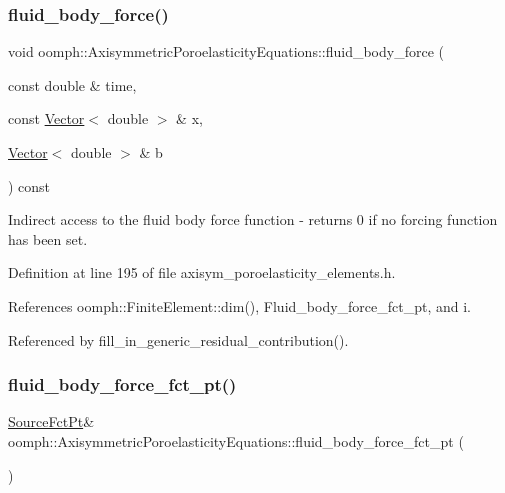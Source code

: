 \subsubsection{\texorpdfstring{fluid\+\_\+body\+\_\+force()}{fluid\_body\_force()}}
{\footnotesize\ttfamily void oomph\+::\+Axisymmetric\+Poroelasticity\+Equations\+::fluid\+\_\+body\+\_\+force (\begin{DoxyParamCaption}\item[{const double \&}]{time,  }\item[{const \hyperlink{classoomph_1_1Vector}{Vector}$<$ double $>$ \&}]{x,  }\item[{\hyperlink{classoomph_1_1Vector}{Vector}$<$ double $>$ \&}]{b }\end{DoxyParamCaption}) const\hspace{0.3cm}{\ttfamily [inline]}}



Indirect access to the fluid body force function -\/ returns 0 if no forcing function has been set. 



Definition at line 195 of file axisym\+\_\+poroelasticity\+\_\+elements.\+h.



References oomph\+::\+Finite\+Element\+::dim(), Fluid\+\_\+body\+\_\+force\+\_\+fct\+\_\+pt, and i.



Referenced by fill\+\_\+in\+\_\+generic\+\_\+residual\+\_\+contribution().

\mbox{\label{classoomph_1_1AxisymmetricPoroelasticityEquations_a966708620019a5a130e3c4a25dcb1fd9}} 
\subsubsection{\texorpdfstring{fluid\+\_\+body\+\_\+force\+\_\+fct\+\_\+pt()}{fluid\_body\_force\_fct\_pt()}\hspace{0.1cm}{\footnotesize\ttfamily [1/2]}}
{\footnotesize\ttfamily \hyperlink{classoomph_1_1AxisymmetricPoroelasticityEquations_a7a2c87557c3d9d405bb07a9f53bb4abe}{Source\+Fct\+Pt}\& oomph\+::\+Axisymmetric\+Poroelasticity\+Equations\+::fluid\+\_\+body\+\_\+force\+\_\+fct\+\_\+pt (\begin{DoxyParamCaption}{ }\end{DoxyParamCaption})\hspace{0.3cm}{\ttfamily [inline]}}



